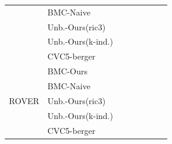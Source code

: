 \begin{table}[htb]
{\begin{tabular}{ll rrrrrr}
  & BMC-Naive         & \SextZextInstcombineNumProblemsTotal{} & \SextZextInstcombineNumSolvedNbmc{}          & \SextZextInstcombineNumTimeoutNbmc{}          & \SextZextInstcombineNumMemoutNbmc{}          & \textbf{\SextZextInstcombineNumUnknownNbmc{}} & \SextZextInstcombineGeomeanMsNbmc{} \\
  & Unb.-Ours(ric3)   & \SextZextInstcombineNumProblemsTotal{} & \SextZextInstcombineNumSolvedMr{}            & \textbf{\SextZextInstcombineNumTimeoutMr{}}   & \textbf{\SextZextInstcombineNumMemoutMr{}}   & \SextZextInstcombineNumUnknownMr{} & \SextZextInstcombineGeomeanMsMr{} \\
  & Unb.-Ours(k-ind.) & \SextZextInstcombineNumProblemsTotal{} & \SextZextInstcombineNumSolvedMk{}            & \textbf{\SextZextInstcombineNumTimeoutMk{}}   & \textbf{\SextZextInstcombineNumMemoutMk{}}   & \SextZextInstcombineNumUnknownMk{} & \SextZextInstcombineGeomeanMsMk{} \\
  & CVC5-berger         & \SextZextInstcombineNumProblemsTotal{} & \SextZextInstcombineNumSolvedC{}             & \SextZextInstcombineNumTimeoutC{}             & \textbf{\SextZextInstcombineNumMemoutC{}}    & \SextZextInstcombineNumUnknownC{} & \textbf{\SextZextInstcombineGeomeanMsC{}} \\
\midrule
\multirow{5}{*}{ROVER}
  & BMC-Ours          & \RoverCactusNumProblemsTotal{} & \textbf{\RoverCactusNumSolvedMbmc{}} & \RoverCactusNumTimeoutMbmc{}          & \textbf{\RoverCactusNumMemoutMbmc{}} & \textbf{\RoverCactusNumUnknownMbmc{}} & \RoverCactusGeomeanMsMbmc{} \\
  & BMC-Naive         & \RoverCactusNumProblemsTotal{} & \RoverCactusNumSolvedNbmc{}          & \textbf{\RoverCactusNumTimeoutNbmc{}} & \RoverCactusNumMemoutNbmc{}          & \textbf{\RoverCactusNumUnknownNbmc{}} & \RoverCactusGeomeanMsNbmc{} \\
  & Unb.-Ours(ric3)   & \RoverCactusNumProblemsTotal{} & \RoverCactusNumSolvedMr{}            & \textbf{\RoverCactusNumTimeoutMr{}}   & \textbf{\RoverCactusNumMemoutMr{}}   & \RoverCactusNumUnknownMr{} & \RoverCactusGeomeanMsMr{} \\
  & Unb.-Ours(k-ind.) & \RoverCactusNumProblemsTotal{} & \RoverCactusNumSolvedMk{}            & \textbf{\RoverCactusNumTimeoutMk{}}   & \textbf{\RoverCactusNumMemoutMk{}}   & \RoverCactusNumUnknownMk{} & \RoverCactusGeomeanMsMk{} \\
  & CVC5-berger         & \RoverCactusNumProblemsTotal{} & \RoverCactusNumSolvedC{}             & \RoverCactusNumTimeoutC{}             & \textbf{\RoverCactusNumMemoutC{}}    & \RoverCactusNumUnknownC{} & \textbf{\RoverCactusGeomeanMsC{}} \\
\bottomrule
\end{tabular}
}
\end{table}

